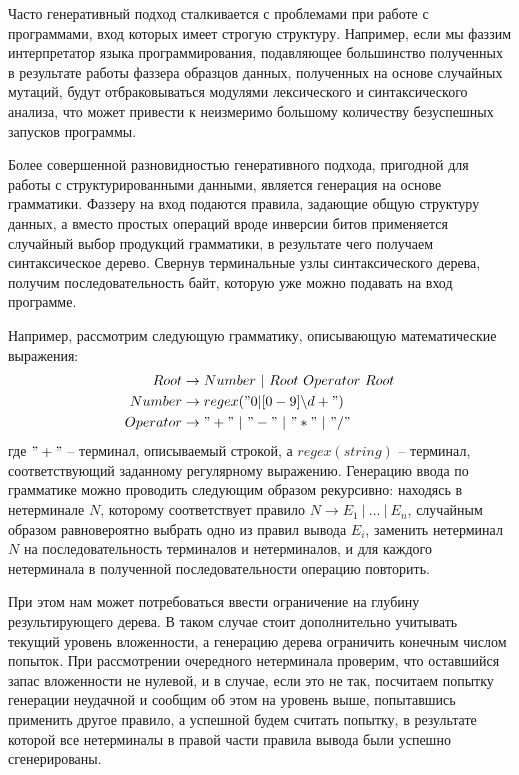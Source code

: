 Часто генеративный подход сталкивается с проблемами при работе с программами, вход которых имеет строгую структуру. Например, если мы фаззим интерпретатор языка программирования, подавляющее большинство полученных в результате работы фаззера образцов данных, полученных на основе случайных мутаций, будут отбраковываться модулями лексического и синтаксического анализа, что может привести к неизмеримо большому количеству безуспешных запусков программы. 

Более совершенной разновидностью генеративного подхода, пригодной для работы с структурированными данными, является генерация на основе грамматики. Фаззеру на вход подаются правила, задающие общую структуру данных, а вместо простых операций вроде инверсии битов применяется случайный выбор продукций грамматики, в результате чего получаем синтаксическое дерево. Свернув терминальные узлы синтаксического дерева, получим последовательность байт, которую уже можно подавать на вход программе.

Например, рассмотрим следующую грамматику, описывающую математические выражения:
\begin{align*} %
	Root &\rightarrow Number \ | \ Root \ Operator \ Root \\
	Number &\rightarrow regex("0|[0-9]\backslash d+") \\
	Operator &\rightarrow "+" \ | \ "-" \ | \ "*" \ | \ "/"	
\end{align*}
где $"+"$ -- терминал, описываемый строкой, а $regex(string)$ -- терминал, соответствующий заданному регулярному выражению. Генерацию ввода по грамматике можно проводить следующим образом рекурсивно: находясь в нетерминале $N$, которому соответствует правило $N \rightarrow E_1 \ | \ ...\  | \ E_n$, случайным образом равновероятно выбрать одно из правил вывода $E_i$, заменить нетерминал $N$ на последовательность терминалов и нетерминалов, и для каждого нетерминала в полученной последовательности операцию повторить. 

При этом нам может потребоваться ввести ограничение на глубину результирующего дерева. В таком случае стоит дополнительно учитывать текущий уровень вложенности, а генерацию дерева ограничить конечным числом попыток. При рассмотрении очередного нетерминала проверим, что оставшийся запас вложенности не нулевой, и в случае, если это не так, посчитаем попытку генерации неудачной и сообщим об этом на уровень выше, попытавшись применить другое правило, а успешной будем считать попытку, в результате которой все нетерминалы в правой части правила вывода были успешно сгенерированы.

